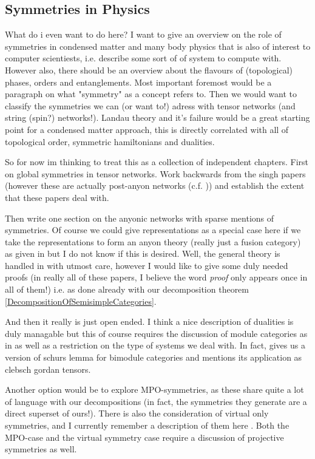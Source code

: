 
\subsection{Symmetries in Physics}

What do i even want to do here? I want to give an overview on the role of symmetries in condensed matter and many body physics that is also of interest to computer scientiests, i.e. describe some sort of of system to compute with. However also, there should be an overview about the flavours of (topological) phases, orders and entanglements. Most important foremost would be a paragraph on what "symmetry" as a concept refers to. Then we would want to classify the symmetries we can (or want to!) adress with tensor networks (and string (spin?) networks!). Landau theory and it's failure would be a great starting point for a condensed matter approach, this is directly correlated with all of topological order, symmetric hamiltonians and dualities. 

So for now im thinking to treat this as a collection of independent chapters. First on global symmetries in tensor networks. Work backwards from the singh papers (however these are actually post-anyon networks (c.f. \cite{pfeiferSimulationAnyonsTensor2010})) and establish the extent that these papers deal with.

Then write one section on the anyonic networks with sparse mentions of symmetries. Of course we could give representations as a special case here if we take the representations to form an anyon theory (really just a fusion category) as given in \cite[§~20]{simonTopologicalQuantum2023} but I do not know if this is desired. Well, the general theory is handled in \cite{devosTensorKitjlJuliaPackage2025} with utmost care, however I would like to give some duly needed proofs (in really all of these papers, I believe the word \emph{proof} only appears once in all of them!) i.e. as done already with our decomposition theorem \ref{DecompositionOfSemisimpleCategories}.

And then it really is just open ended. I think a nice description of dualities is duly managable but this of course requires the discussion of module categories as in \cite{lootensDualitiesOnedimensionalQuantum2024} as well as a restriction on the type of systems we deal with.
In fact, \cite{bridgemanInvertibleBimoduleCategories2023} gives us a version of schurs lemma for bimodule categories and mentions its application as clebsch gordan tensors.

Another option would be to explore MPO-symmetries, as these share quite a lot of language with our decompositions (in fact, the symmetries they generate are a direct superset of ours!). There is also the consideration of virtual only symmetries, and I currently remember a description of them here \cite{degrootTopologicalPhasesSymmetries2022}. Both the MPO-case and the virtual symmetry case require a discussion of projective symmetries as well.

